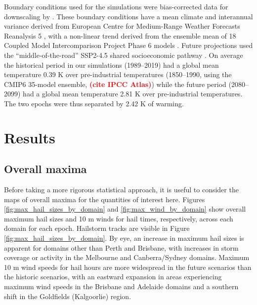 \documentclass[]{agujournal2019}\usepackage[]{graphicx}\usepackage[]{xcolor}
\newcommand*{\todo}[1]{\textbf{\textcolor{red}{(#1)}}}
\begin{document}
Boundary conditions used for the simulations were bias-corrected data for downscaling by . These boundary conditions have a mean climate and interannual variance derived from European Centre for Medium-Range Weather Forecasts Reanalysis 5 \cite<ERA5,>{Hersbach_QJRMS_2020}, with a non-linear trend derived from the ensemble mean of 18 Coupled Model Intercomparison Project Phase 6 \cite<CMIP6,>{Eyring_GMD_2016} models \cite{Xu_SD_2021}. Future projections used the ``middle-of-the-road'' SSP2-4.5 shared socioeconomic pathway \cite<SSP,>{ONeill_GEC_2017}. On average the historical period in our simulations (1989--2019) had a global mean temperature 0.39 K over pre-industrial temperatures (1850--1990, using the CMIP6 35-model ensemble, \todo{cite IPCC Atlas}) while the future period (2080--2099) had a global mean temperature 2.81 K over pre-industrial temperatures. The two epochs were thus separated by 2.42 K of warming.

\section{Results}
\label{sec:results}

\subsection{Overall maxima}

Before taking a more rigorous statistical approach, it is useful to consider the maps of overall maxima for the quantities of interest here. Figures \ref{fig:max_hail_sizes_by_domain} and \ref{fig:max_wind_by_domain} show overall maximum hail sizes and 10 m winds for hail times, respectively, across each domain for each epoch. Hailstorm tracks are visible in Figure \ref{fig:max_hail_sizes_by_domain}. By eye, an increase in maximum hail sizes is apparent for domains other than Perth and Brisbane, with increases in storm coverage or activity in the Melbourne and Canberra/Sydney domains. Maximum 10 m wind speeds for hail hours are more widespread in the future scenarios than the historic scenarios, with an eastward expansion in areas experiencing maximum wind speeds in the Brisbane and Adelaide domains and a southern shift in the Goldfields (Kalgoorlie) region.
\end{document}

